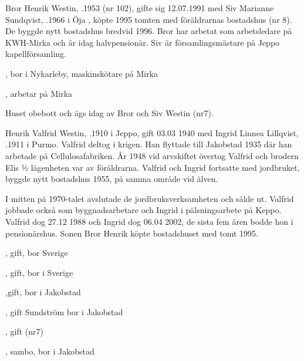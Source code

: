 
Bror Henrik Westin, .1953 (nr 102), gifte sig 12.07.1991 med Siv Marianne Sundqvist, .1966  i Öja , köpte 1995 tomten med föräldrarnas bostadshus (nr 8). De byggde nytt bostadshus bredvid 1996. Bror har arbetat som arbetsledare på KWH-Mirka och är idag halvpensionär. Siv är församlingsmästare på Jeppo kapellförsamling.

\begin{jhchildren}
  \item {}, bor i Nykarleby, maskinskötare på Mirka
  \item {}, arbetar på Mirka
\end{jhchildren}




Huset obebott och ägs idag av Bror och Siv Westin (nr7).

Henrik Valfrid Westin, .1910 i Jeppo, gift 03.03 1940 med Ingrid Linnea Lillqvist, .1911 i Purmo. Valfrid deltog i krigen. Han flyttade till Jakobstad 1935 där han arbetade på Cellulosafabriken.  År 1948 vid arvskiftet övertog Valfrid och brodern Elis ½ lägenheten var av föräldrarna. Valfrid och Ingrid fortsatte med jordbruket, byggde nytt bostadshus 1955, på samma område vid älven.

I mitten på 1970-talet avslutade de jordbruksverksamheten och sålde ut. Valfrid jobbade också som byggnadsarbetare och Ingrid i pälsningsarbete på Keppo. Valfrid dog 27.12 1988 och Ingrid dog 06.04 2002, de sista fem åren bodde hon i  pensionärshus. Sonen Bror Henrik köpte bostadshuset med tomt 1995.
\begin{jhchildren}
  \item {}, gift, bor Sverige
  \item {}, gift, bor i Sverige
  \item {},gift, bor i Jakobstad
  \item {}, gift Sundström bor i Jakobstad
  \item {}, gift (nr7)
  \item {}, sambo, bor i Jakobstad
\end{jhchildren}



